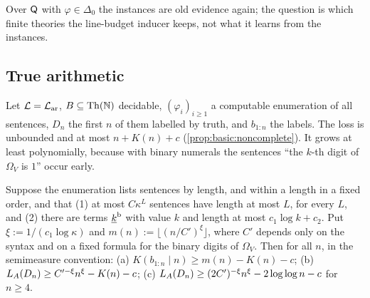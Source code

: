 Over $\mathsf{Q}$ with $\varphi\in\Delta_0$ the instances are old evidence again; the question is which finite theories the line-budget inducer keeps, not what it learns from the instances.

\subsection{True arithmetic}\label{app:logic:thn}

Let $\mathcal L=\mathcal{L}_{\mathrm{ar}}$, $B\subseteq\mathrm{Th}(\mathbb N)$ decidable, $(\varphi_i)_{i\ge1}$ a computable enumeration of all sentences, $D_n$ the first $n$ of them labelled by truth, and $b_{1:n}$ the labels. The loss is unbounded and at most $n+K(n)+c$ (\cref{prop:basic:noncomplete}). It grows at least polynomially, because with binary numerals the sentences ``the $k$-th digit of $\Omega_V$ is $1$'' occur early.

\begin{theorem}\label{thm:logic:thn}
Suppose the enumeration lists sentences by length, and within a length in a fixed order, and that (1) at most $C\kappa^L$ sentences have length at most $L$, for every $L$, and (2) there are terms $\underline{k}^{\rm b}$ with value $k$ and length at most $c_1\log k+c_2$. Put $\xi:=1/(c_1\log\kappa)$ and $m(n):=\lfloor(n/C')^\xi\rfloor$, where $C'$ depends only on the syntax and on a fixed formula for the binary digits of $\Omega_V$. Then for all $n$, in the semimeasure convention: (a) $K(b_{1:n}\mid n)\ge m(n)-K(n)-c$; (b) $L_{A}(D_n)\ge C'^{-\xi}n^\xi-K(n)-c$; (c) $L_{A}(D_n)\ge(2C')^{-\xi}n^\xi-2\log\log n-c$ for $n\ge4$.
\end{theorem}

